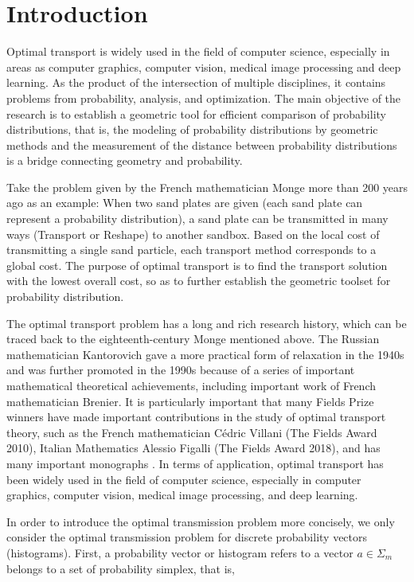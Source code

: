 
\section{Introduction}

Optimal transport is widely used in the field of computer science, especially in areas as computer graphics, computer vision, medical image processing and deep learning. As the product of the intersection of multiple disciplines, it contains problems from probability, analysis, and optimization. The main objective of the research is to establish a geometric tool for efficient comparison of probability distributions, that is, the modeling of probability distributions by geometric methods and the measurement of the distance between probability distributions is a bridge connecting geometry and probability.

Take the problem given by the French mathematician Monge more than 200 years ago as an example: When two sand plates are given (each sand plate can represent a probability distribution), a sand plate can be transmitted in many ways (Transport or Reshape) to another sandbox. Based on the local cost of transmitting a single sand particle, each transport method corresponds to a global cost. The purpose of optimal transport is to find the transport solution with the lowest overall cost, so as to further establish the geometric toolset for probability distribution.

The optimal transport problem has a long and rich research history, which can be traced back to the eighteenth-century Monge mentioned above. The Russian mathematician Kantorovich gave a more practical form of relaxation in the 1940s and was further promoted in the 1990s because of a series of important mathematical theoretical achievements, including important work of French mathematician Brenier. It is particularly important that many Fields Prize winners have made important contributions in the study of optimal transport theory, such as the French mathematician Cédric Villani (The Fields Award 2010), Italian Mathematics Alessio Figalli (The Fields Award 2018), and has many important monographs \cite{book1, book2, book3, book4}. In terms of application, optimal transport has been widely used in the field of computer science, especially in computer graphics, computer vision, medical image processing, and deep learning.

In order to introduce the optimal transmission problem more concisely, we only consider the optimal transmission problem for discrete probability vectors (histograms). First, a probability vector or histogram refers to a vector $a \in \Sigma_m$ belongs to a set of probability simplex, that is,

